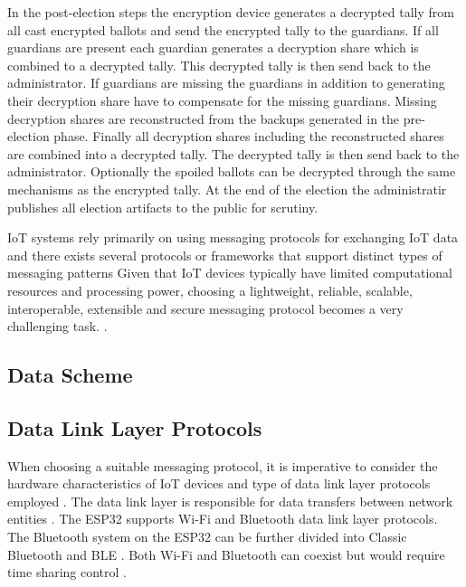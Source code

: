 In the post-election steps the encryption device generates a decrypted tally from all cast encrypted ballots and send the encrypted tally to the guardians. If all guardians are present each guardian generates a decryption share which is combined to a decrypted tally. This decrypted tally is then send back to the administrator. If guardians are missing the guardians in addition to generating their decryption share have to compensate for the missing guardians. Missing decryption shares are reconstructed from the backups generated in the pre-election phase. Finally all decryption shares including the reconstructed shares are combined into a decrypted tally. The decrypted tally is then send back to the administrator. Optionally the spoiled ballots can be decrypted through the same mechanisms as the encrypted tally. At the end of the election the administratir publishes all election artifacts to the public for scrutiny.


IoT systems rely primarily on using messaging protocols for exchanging
IoT data and there exists several protocols or frameworks that support distinct types of messaging patterns 
Given that IoT devices typically have limited computational resources and processing power, choosing a
lightweight, reliable, scalable, interoperable, extensible and secure messaging protocol becomes a very
challenging task. \cite[1]{protocols}.


\subsection{Data Scheme}

\subsection{Data Link Layer Protocols}
When choosing a suitable messaging protocol, it is imperative to consider the hardware characteristics of IoT devices and type of data link layer protocols employed \cite[1-2]{protocols}. The data link layer is responsible for data transfers between network entities \cite[3]{protocols}. The ESP32 supports Wi-Fi and Bluetooth data link layer protocols. The Bluetooth system on the ESP32 can be further divided into Classic Bluetooth and \ac{BLE} \cite{esp-prog} \cite{esp-faq}. Both Wi-Fi and Bluetooth can coexist but would require time sharing control \cite{esp-faq}.

